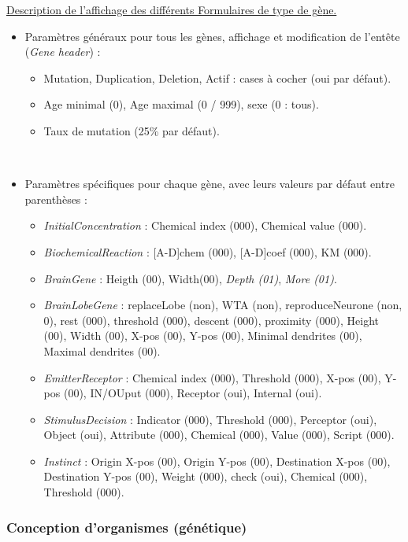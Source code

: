 \documentclass[11pt,twoside,a4paper]{article}
\begin{document}
\underline{Description de l'affichage des diff{\'e}rents Formulaires de type de g{\`e}ne.}~\\
\begin{itemize}
	\item Param{\`e}tres g{\'e}n{\'e}raux pour tous les g{\`e}nes, affichage et modification de l'ent{\^e}te (\emph{Gene header}) : 
	\begin{itemize}
		\item Mutation, Duplication, Deletion, Actif : cases {\`a} cocher (oui par d{\'e}faut). 
		\item Age minimal (0), Age maximal (0 / 999), sexe (0 : tous). 
		\item Taux de mutation (25\% par d{\'e}faut). 
	\end{itemize}~\\
	\item Param{\`e}tres sp{\'e}cifiques pour chaque g{\`e}ne, avec leurs valeurs par d{\'e}faut entre parenth{\`e}ses : 
	\begin{itemize}
		\item \emph{InitialConcentration} : Chemical index (000), Chemical value (000). 
		\item \emph{BiochemicalReaction} : [A-D]chem (000), [A-D]coef (000), KM (000). 
		\item \emph{BrainGene} : Heigth (00), Width(00), \textit{Depth (01)}, \textit{More (01)}. 
		\item \emph{BrainLobeGene} : replaceLobe (non), WTA (non), reproduceNeurone (non, 0), rest (000), threshold (000), descent (000), proximity (000), Height (00), Width (00), X-pos (00), Y-pos (00), Minimal dendrites (00), Maximal dendrites (00). 
		\item \emph{EmitterReceptor} : Chemical index (000), Threshold (000), X-pos (00), Y-pos (00), IN/OUput (000), Receptor (oui), Internal (oui). 
		\item \emph{StimulusDecision} : Indicator (000), Threshold (000), Perceptor (oui), Object (oui), Attribute (000), Chemical (000), Value (000), Script (000). 
		\item \emph{Instinct} : Origin X-pos (00), Origin Y-pos (00), Destination X-pos (00), Destination Y-pos (00), Weight (000), check (oui), Chemical (000), Threshold (000). 
	\end{itemize}
\end{itemize}

\clearpage

\subsubsection{Conception d'organismes (g{\'e}n{\'e}tique)}
\end{document}
